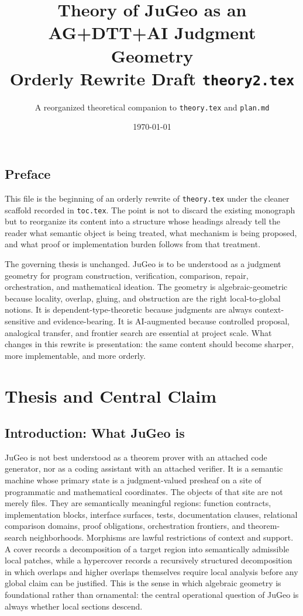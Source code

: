 \documentclass[11pt]{report}
\title{Theory of JuGeo as an AG+DTT+AI Judgment Geometry\\Orderly Rewrite Draft \texttt{theory2.tex}}
\author{A reorganized theoretical companion to \texttt{theory.tex} and \texttt{plan.md}}
\date{\today}
\begin{document}
\maketitle
\tableofcontents

\chapter*{Preface}
This file is the beginning of an orderly rewrite of \texttt{theory.tex} under the cleaner scaffold recorded in \texttt{toc.tex}. The point is not to discard the existing monograph but to reorganize its content into a structure whose headings already tell the reader what semantic object is being treated, what mechanism is being proposed, and what proof or implementation burden follows from that treatment.

The governing thesis is unchanged. JuGeo is to be understood as a judgment geometry for program construction, verification, comparison, repair, orchestration, and mathematical ideation. The geometry is algebraic-geometric because locality, overlap, gluing, and obstruction are the right local-to-global notions. It is dependent-type-theoretic because judgments are always context-sensitive and evidence-bearing. It is AI-augmented because controlled proposal, analogical transfer, and frontier search are essential at project scale. What changes in this rewrite is presentation: the same content should become sharper, more implementable, and more orderly.
\part{Thesis and Central Claim}
\chapter{Introduction: What JuGeo is}
JuGeo is not best understood as a theorem prover with an attached code generator, nor as a coding assistant with an attached verifier. It is a semantic machine whose primary state is a judgment-valued presheaf on a site of programmatic and mathematical coordinates. The objects of that site are not merely files. They are semantically meaningful regions: function contracts, implementation blocks, interface surfaces, tests, documentation clauses, relational comparison domains, proof obligations, orchestration frontiers, and theorem-search neighborhoods. Morphisms are lawful restrictions of context and support. A cover records a decomposition of a target region into semantically admissible local patches, while a hypercover records a recursively structured decomposition in which overlaps and higher overlaps themselves require local analysis before any global claim can be justified. This is the sense in which algebraic geometry is foundational rather than ornamental: the central operational question of JuGeo is always whether local sections descend.
\end{document}
